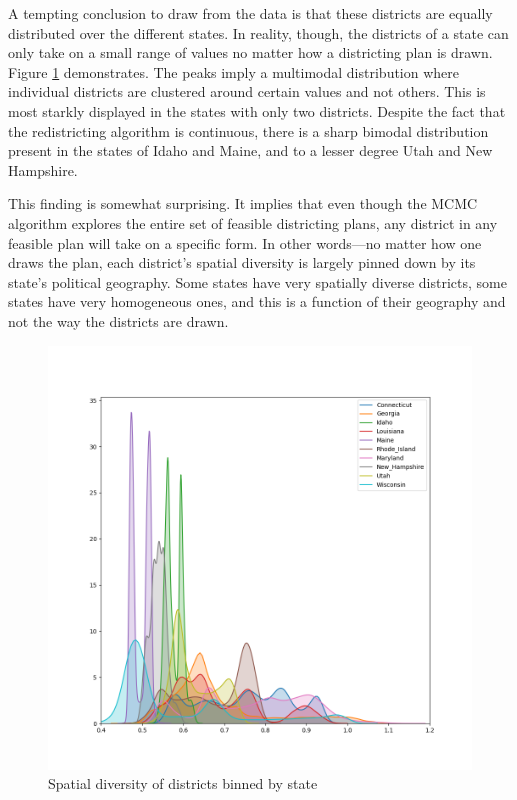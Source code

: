 \documentclass[]{article}
\begin{document}
A tempting conclusion to draw from the data is that these districts are
equally distributed over the different states. In reality, though, the
districts of a state can only take on a small range of values no matter
how a districting plan is drawn. Figure \ref{sd_districts_binned}
demonstrates. The peaks imply a multimodal distribution where individual
districts are clustered around certain values and not others. This is
most starkly displayed in the states with only two districts. Despite
the fact that the redistricting algorithm is continuous, there is a
sharp bimodal distribution present in the states of Idaho and Maine, and
to a lesser degree Utah and New Hampshire.

This finding is somewhat surprising. It implies that even though the
MCMC algorithm explores the entire set of feasible districting plans,
any district in any feasible plan will take on a specific form. In other
words---no matter how one draws the plan, each district's spatial
diversity is largely pinned down by its state's political geography.
Some states have very spatially diverse districts, some states have very
homogeneous ones, and this is a function of their geography and not the
way the districts are drawn.

\begin{figure}
\centering
\includegraphics{../30_results/all_districts_sd.png}
\caption{Spatial diversity of districts binned by state
\label{sd_districts_binned}}
\end{figure}
\end{document}
